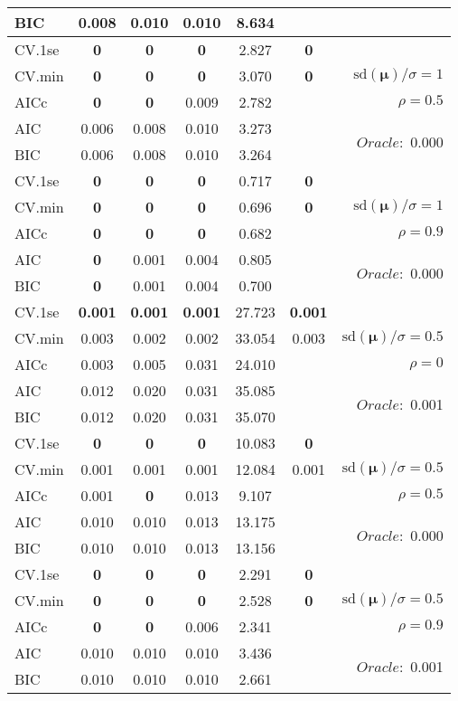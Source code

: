 \begin{table}
\begin{center}
\begin{tabular}{l*{5}{c}|r}
BIC & 0.008 & 0.010 & 0.010 & 8.634 & &  \\
 \hline 
CV.1se & {\bf 0} & {\bf 0} & {\bf 0} & 2.827 & {\bf 0} & \\
CV.min & {\bf 0} & {\bf 0} & {\bf 0} & 3.070 & {\bf 0} &  $\mathrm{sd}(\mathbf{\mu})/\sigma=1$ \\
AICc & {\bf 0} & {\bf 0} & 0.009 & 2.782 & & $\rho=0.5$ \\
AIC & 0.006 & 0.008 & 0.010 & 3.273 & &  \multirow{2}{*}{$Oracle: $ 0.000} \\
BIC & 0.006 & 0.008 & 0.010 & 3.264 & &  \\
 \hline 
CV.1se & {\bf 0} & {\bf 0} & {\bf 0} & 0.717 & {\bf 0} & \\
CV.min & {\bf 0} & {\bf 0} & {\bf 0} & 0.696 & {\bf 0} &  $\mathrm{sd}(\mathbf{\mu})/\sigma=1$ \\
AICc & {\bf 0} & {\bf 0} & {\bf 0} & 0.682 & & $\rho=0.9$ \\
AIC & {\bf 0} & 0.001 & 0.004 & 0.805 & &  \multirow{2}{*}{$Oracle: $ 0.000} \\
BIC & {\bf 0} & 0.001 & 0.004 & 0.700 & &  \\
 \hline 
CV.1se & {\bf 0.001} & {\bf 0.001} & {\bf 0.001} & 27.723 & {\bf 0.001} & \\
CV.min & 0.003 & 0.002 & 0.002 & 33.054 & 0.003 &  $\mathrm{sd}(\mathbf{\mu})/\sigma=0.5$ \\
AICc & 0.003 & 0.005 & 0.031 & 24.010 & & $\rho=0$ \\
AIC & 0.012 & 0.020 & 0.031 & 35.085 & &  \multirow{2}{*}{$Oracle: $ 0.001} \\
BIC & 0.012 & 0.020 & 0.031 & 35.070 & &  \\
 \hline 
CV.1se & {\bf 0} & {\bf 0} & {\bf 0} & 10.083 & {\bf 0} & \\
CV.min & 0.001 & 0.001 & 0.001 & 12.084 & 0.001 &  $\mathrm{sd}(\mathbf{\mu})/\sigma=0.5$ \\
AICc & 0.001 & {\bf 0} & 0.013 & 9.107 & & $\rho=0.5$ \\
AIC & 0.010 & 0.010 & 0.013 & 13.175 & &  \multirow{2}{*}{$Oracle: $ 0.000} \\
BIC & 0.010 & 0.010 & 0.013 & 13.156 & &  \\
 \hline 
CV.1se & {\bf 0} & {\bf 0} & {\bf 0} & 2.291 & {\bf 0} & \\
CV.min & {\bf 0} & {\bf 0} & {\bf 0} & 2.528 & {\bf 0} &  $\mathrm{sd}(\mathbf{\mu})/\sigma=0.5$ \\
AICc & {\bf 0} & {\bf 0} & 0.006 & 2.341 & & $\rho=0.9$ \\
AIC & 0.010 & 0.010 & 0.010 & 3.436 & &  \multirow{2}{*}{$Oracle: $ 0.001} \\
BIC & 0.010 & 0.010 & 0.010 & 2.661 & &  \\
 \hline 
\end{tabular}
\end{center}
\vspace{-1cm}
\end{table}




